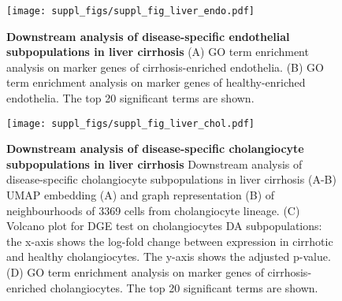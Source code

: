 \documentclass[
]{article}
\begin{document}
\begin{figure}
\centering
\texttt{[image: suppl\_figs/suppl\_fig\_liver\_endo.pdf]}
\caption{\label{fig:sup-fig-liver-endo}\textbf{Downstream analysis of disease-specific endothelial subpopulations in liver cirrhosis}
(A) GO term enrichment analysis on marker genes of cirrhosis-enriched endothelia. (B) GO term enrichment analysis on marker genes of healthy-enriched endothelia. The top 20 significant terms are shown.}
\end{figure}




\begin{figure}
\centering
\texttt{[image: suppl\_figs/suppl\_fig\_liver\_chol.pdf]}
\caption{\label{fig:sup-fig-liver-chol}\textbf{Downstream analysis of disease-specific cholangiocyte subpopulations in liver cirrhosis}
Downstream analysis of disease-specific cholangiocyte subpopulations in liver cirrhosis
(A-B) UMAP embedding (A) and graph representation (B) of neighbourhoods of 3369 cells from cholangiocyte lineage.
(C) Volcano plot for DGE test on cholangiocytes DA subpopulations: the x-axis shows the log-fold change between expression in cirrhotic and healthy cholangiocytes. The y-axis shows the adjusted p-value.
(D) GO term enrichment analysis on marker genes of cirrhosis-enriched cholangiocytes. The top 20 significant terms are shown.}
\end{figure}
\end{document}
